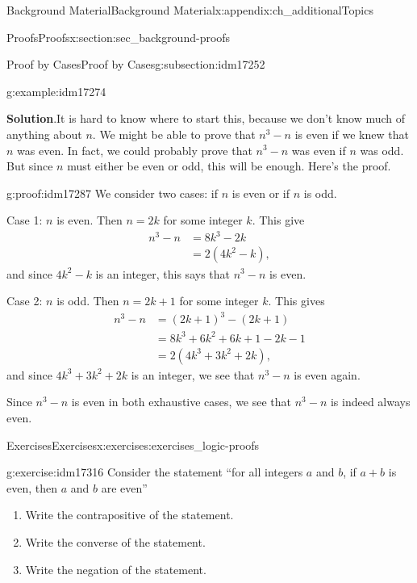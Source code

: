 \documentclass[oneside,10pt,]{book}
\numberwithin{equation}{chapter}
\newcommand{\amp}{&}
\begin{document}
\begin{appendixptx}{Background Material}{}{Background Material}{}{}{x:appendix:ch_additionalTopics}
\begin{sectionptx}{Proofs}{}{Proofs}{}{}{x:section:sec_background-proofs}
\begin{subsectionptx}{Proof by Cases}{}{Proof by Cases}{}{}{g:subsection:idm17252}
\begin{example}{}{g:example:idm17274}
\par\smallskip%
\noindent\textbf{Solution}.\hypertarget{g:solution:idm17279}{}\quad{}It is hard to know where to start this, because we don't know much of anything about \(n\). We might be able to prove that \(n^3 - n\) is even if we knew that \(n\) was even. In fact, we could probably prove that \(n^3-n\) was even if \(n\) was odd. But since \(n\) must either be even or odd, this will be enough. Here's the proof.%
\begin{proofptx}{}{g:proof:idm17287}
We consider two cases: if \(n\) is even or if \(n\) is odd.%
\par
Case 1: \(n\) is even. Then \(n = 2k\) for some integer \(k\). This give%
\begin{align*}
n^3 - n \amp = 8k^3 - 2k\\
\amp = 2(4k^2 - k),
\end{align*}
and since \(4k^2 - k\) is an integer, this says that \(n^3-n\) is even.%
\par
Case 2: \(n\) is odd. Then \(n = 2k+1\) for some integer \(k\). This gives%
\begin{align*}
n^3 - n \amp = (2k+1)^3 - (2k+1)\\
\amp = 8k^3 + 6k^2 + 6k + 1 - 2k - 1\\
\amp = 2(4k^3 + 3k^2 + 2k),
\end{align*}
and since \(4k^3 + 3k^2 + 2k\) is an integer, we see that \(n^3 - n\) is even again.%
\par
Since \(n^3 - n\) is even in both exhaustive cases, we see that \(n^3 - n\) is indeed always even.%
\end{proofptx}
\end{example}
\end{subsectionptx}
%
%
\typeout{************************************************}
\typeout{************************************************}
%
\begin{exercises-subsection}{Exercises}{}{Exercises}{}{}{x:exercises:exercises_logic-proofs}
\begin{divisionexercise}{1}{}{}{g:exercise:idm17316}%
Consider the statement ``for all integers \(a\) and \(b\), if \(a + b\) is even, then \(a\) and \(b\) are even''%
\par
%
\begin{enumerate}[label=(\alph*)]
\item{}Write the contrapositive of the statement.%
\item{}Write the converse of the statement.%
\item{}Write the negation of the statement.%

\end{enumerate}
\end{divisionexercise}
\end{exercises-subsection}
\end{sectionptx}
\end{appendixptx}
\end{document}

